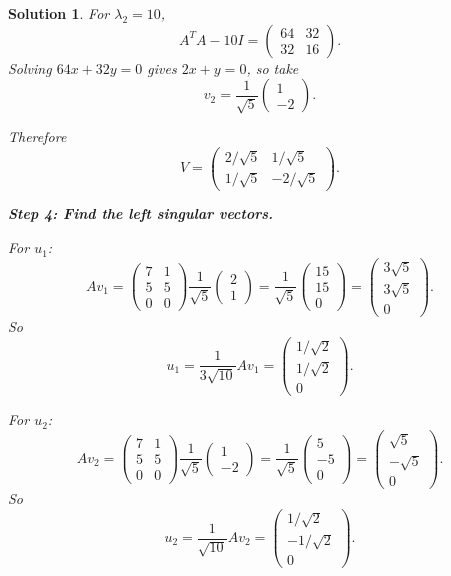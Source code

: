 \documentclass[11pt,a4paper]{article}
\theoremstyle{sol}
\newtheorem*{solution}{Solution}
\begin{document}
\begin{solution}
For $\lambda_2=10$,
\[
A^TA-10I=
\begin{pmatrix}
64&32\\
32&16
\end{pmatrix}.
\]
Solving $64x+32y=0$ gives $2x+y=0$, so take
\[
v_2=\frac{1}{\sqrt5}\begin{pmatrix}1\\-2\end{pmatrix}.
\]

Therefore
\[
V=
\begin{pmatrix}
2/\sqrt5&1/\sqrt5\\
1/\sqrt5&-2/\sqrt5
\end{pmatrix}.
\]

\textbf{Step 4: Find the left singular vectors.}

For $u_1$:
\[
Av_1=
\begin{pmatrix}
7&1\\
5&5\\
0&0
\end{pmatrix}
\frac{1}{\sqrt5}\begin{pmatrix}2\\1\end{pmatrix}
=\frac{1}{\sqrt5}\begin{pmatrix}15\\15\\0\end{pmatrix}
=\begin{pmatrix}3\sqrt5\\3\sqrt5\\0\end{pmatrix}.
\]
So
\[
u_1=\frac{1}{3\sqrt{10}}Av_1
=\begin{pmatrix}1/\sqrt2\\1/\sqrt2\\0\end{pmatrix}.
\]

For $u_2$:
\[
Av_2=
\begin{pmatrix}
7&1\\
5&5\\
0&0
\end{pmatrix}
\frac{1}{\sqrt5}\begin{pmatrix}1\\-2\end{pmatrix}
=\frac{1}{\sqrt5}\begin{pmatrix}5\\-5\\0\end{pmatrix}
=\begin{pmatrix}\sqrt5\\-\sqrt5\\0\end{pmatrix}.
\]
So
\[
u_2=\frac{1}{\sqrt{10}}Av_2
=\begin{pmatrix}1/\sqrt2\\-1/\sqrt2\\0\end{pmatrix}.
\]


\end{solution}
\end{document}
